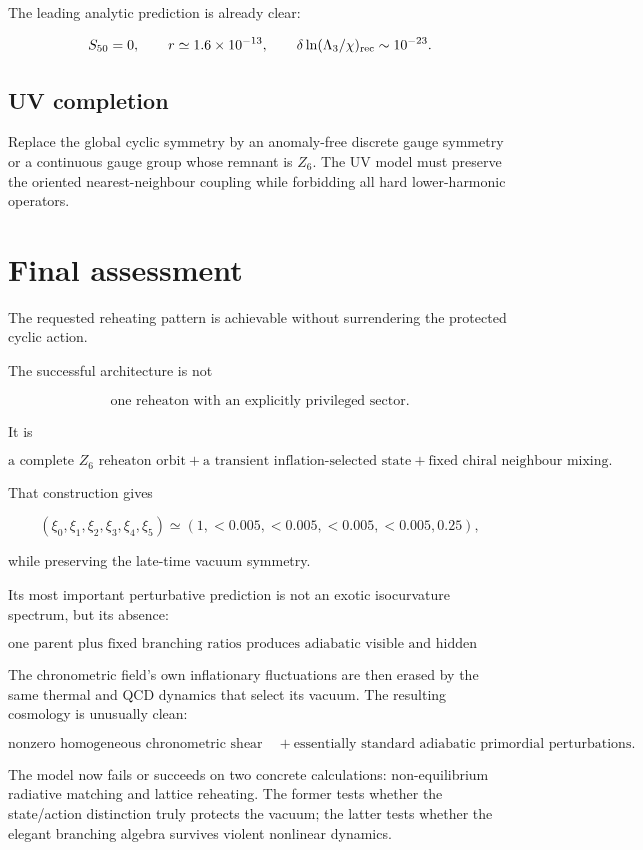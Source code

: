 \documentclass[
  10pt,
]{article}
\begin{document}
The leading analytic prediction is already clear:

\[
S_{50}=0,
\qquad
r\simeq1.6\times10^{-13},
\qquad
\delta\ln(\Lambda_3/\chi)_{\rm rec}\sim10^{-23}.
\]

\subsection{UV completion}\label{uv-completion}

Replace the global cyclic symmetry by an anomaly-free discrete gauge
symmetry or a continuous gauge group whose remnant is \(Z_6\). The UV
model must preserve the oriented nearest-neighbour coupling while
forbidding all hard lower-harmonic operators.

\section{Final assessment}\label{final-assessment}

The requested reheating pattern is achievable without surrendering the
protected cyclic action.

The successful architecture is not

\[
\text{one reheaton with an explicitly privileged sector}.
\]

It is

\[
\boxed{
\text{a complete }Z_6\text{ reheaton orbit}
+
\text{a transient inflation-selected state}
+
\text{fixed chiral neighbour mixing}.
}
\]

That construction gives

\[
(\xi_0,\xi_1,\xi_2,\xi_3,\xi_4,\xi_5)
\simeq
(1,<0.005,<0.005,<0.005,<0.005,0.25),
\]

while preserving the late-time vacuum symmetry.

Its most important perturbative prediction is not an exotic isocurvature
spectrum, but its absence:

\[
\boxed{
\text{one parent plus fixed branching ratios produces adiabatic visible and hidden radiation.}
}
\]

The chronometric field's own inflationary fluctuations are then erased
by the same thermal and QCD dynamics that select its vacuum. The
resulting cosmology is unusually clean:

\[
\boxed{
\text{nonzero homogeneous chronometric shear}
\quad+
\text{essentially standard adiabatic primordial perturbations}.
}
\]

The model now fails or succeeds on two concrete calculations:
non-equilibrium radiative matching and lattice reheating. The former
tests whether the state/action distinction truly protects the vacuum;
the latter tests whether the elegant branching algebra survives violent
nonlinear dynamics.
\end{document}
